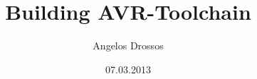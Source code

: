 \documentclass[a4paper]{refman}
\begin{document}
\title{Building AVR-Toolchain}
\author{Angelos Drossos}
\date{07.03.2013}
\maketitle
\end{document}
